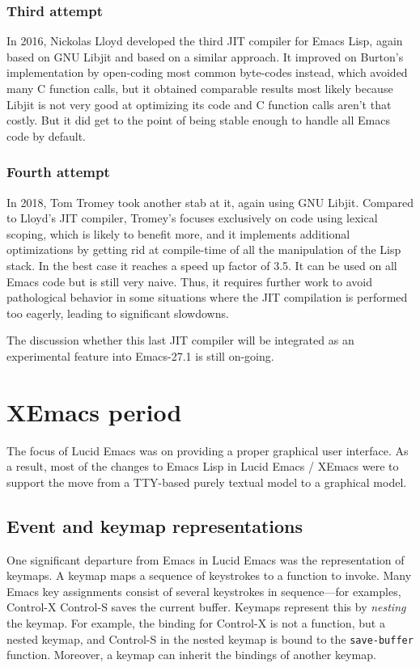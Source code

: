 \documentclass[format=acmsmall, review]{acmart}
\newcommand \Elisp {Emacs Lisp}
\begin{document}
\subsubsection{Third attempt}
In 2016, Nickolas Lloyd developed the third JIT compiler for \Elisp, again
based on GNU Libjit and based on a similar approach.  It improved on
Burton's implementation by open-coding most common byte-codes instead, which
avoided many C function calls, but it obtained comparable results most
likely because Libjit is not very good at optimizing its code and C function
calls aren't that costly.  But it did get to the point of being stable enough
to handle all Emacs code by default.

\subsubsection{Fourth attempt}
In 2018, Tom Tromey took another stab at it, again using GNU Libjit.
Compared to Lloyd's JIT compiler, Tromey's focuses exclusively on code using lexical scoping,
which is likely to benefit more, and it implements additional optimizations
by getting rid at compile-time of all the manipulation of the Lisp stack.
In the best case it reaches a speed up factor of 3.5.
It can be used on all Emacs code but is still
very naive.  Thus, it requires further work to avoid
pathological behavior in some situations where the JIT compilation is
performed too eagerly, leading to significant slowdowns.

The discussion whether this last JIT compiler will be integrated as an
experimental feature into Emacs-27.1 is still on-going.

\section{XEmacs period}         %
\label{sec:xemacs}

The focus of Lucid Emacs was on providing a proper graphical user
interface.  As a result, most of the changes to \Elisp{} in Lucid
Emacs / XEmacs were to support the move from a TTY-based purely
textual model to a graphical model.

\subsection{Event and keymap representations}

One significant departure from Emacs in Lucid Emacs was the
representation of keymaps.  A keymap maps a sequence of keystrokes to
a function to invoke.  Many Emacs key assignments consist of several
keystrokes in sequence---for examples, Control-X Control-S saves the
current buffer.  Keymaps represent this by \emph{nesting} the keymap.
For example, the binding for Control-X is not a function, but a nested
keymap, and Control-S in the nested keymap is bound to the
\texttt{save-buffer} function.  Moreover, a keymap can inherit the
bindings of another keymap.
\end{document}
